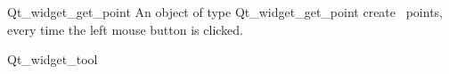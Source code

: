 
\begin{ccRefClass}{Qt_widget_get_point}
\ccDefinition
An object of type Qt\_widget\_get\_point create \cgal\ points, every time 
the left mouse button is clicked.

\ccInheritsFrom
Qt\_widget\_tool

\ccGlue

\ccCreation
{}


\end{ccRefClass}









